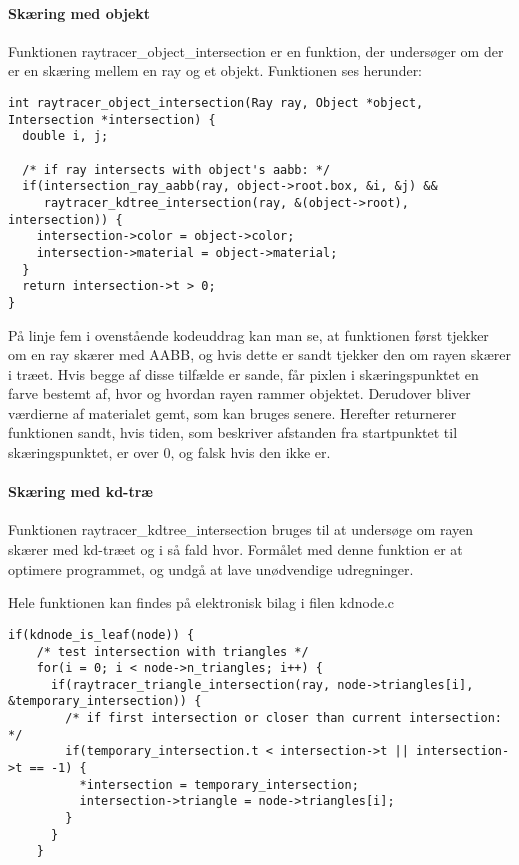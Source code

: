 \paragraph{Skæring med objekt}

Funktionen raytracer\_object\_intersection er en funktion, der undersøger om der er en skæring mellem en ray og et objekt. Funktionen ses herunder:

\begin{lstlisting}[style=Cstyle, caption=raytracer\_object\_intersection]
int raytracer_object_intersection(Ray ray, Object *object, Intersection *intersection) {
  double i, j;
  
  /* if ray intersects with object's aabb: */
  if(intersection_ray_aabb(ray, object->root.box, &i, &j) && 
     raytracer_kdtree_intersection(ray, &(object->root), intersection)) {
    intersection->color = object->color;
    intersection->material = object->material;
  }
  return intersection->t > 0;
}
\end{lstlisting}

På linje fem i ovenstående kodeuddrag kan man se, at funktionen først tjekker om en ray skærer med AABB, og hvis dette er sandt tjekker den om rayen skærer i træet. Hvis begge af disse tilfælde er sande, får pixlen i skæringspunktet en farve bestemt af, hvor og hvordan rayen rammer objektet. Derudover bliver værdierne af materialet gemt, som kan bruges senere. Herefter returnerer funktionen sandt, hvis tiden, som beskriver afstanden fra startpunktet til skæringspunktet, er over 0, og falsk hvis den ikke er.


\paragraph{Skæring med kd-træ}

Funktionen raytracer\_kdtree\_intersection bruges til at undersøge om rayen skærer med kd-træet og i så fald hvor. Formålet med denne funktion er at optimere programmet, og undgå at lave unødvendige udregninger. 

Hele funktionen kan findes på elektronisk bilag i filen kdnode.c

\begin{lstlisting}[style=Cstyle, caption=if(leaf)]
  if(kdnode_is_leaf(node)) {
    /* test intersection with triangles */
    for(i = 0; i < node->n_triangles; i++) {
      if(raytracer_triangle_intersection(ray, node->triangles[i], &temporary_intersection)) {
        /* if first intersection or closer than current intersection: */
        if(temporary_intersection.t < intersection->t || intersection->t == -1) {
          *intersection = temporary_intersection;
          intersection->triangle = node->triangles[i];
        }
      }
    }
\end{lstlisting}

